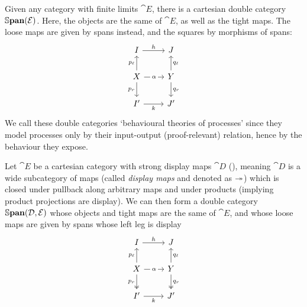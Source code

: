 \begin{example}
\label{ex:behav-processes}
	Given any category with finite limits $\cat E$, there is a cartesian double category $\Span(\cat E)$.
	Here, the objects are the same of $\cat E$, as well as the tight maps.
	The loose maps are given by spans instead, and the squares by morphisms of spans:
	\begin{equation}
		\begin{tikzcd}[ampersand replacement=\&]
			I \& J \\
			X \& Y \\
			{I'} \& {J'}
			\arrow["{p_r}"', from=2-1, to=3-1]
			\arrow["{q_r}", from=2-2, to=3-2]
			\arrow["{p_\ell}", from=2-1, to=1-1]
			\arrow["{q_\ell}"', from=2-2, to=1-2]
			\arrow["\alpha"{description}, from=2-1, to=2-2]
			\arrow["k"', from=3-1, to=3-2]
			\arrow["h", from=1-1, to=1-2]
		\end{tikzcd}
	\end{equation}
	We call these double categories `behavioural theories of processes' since they model processes only by their input-output (proof-relevant) relation, hence by the behaviour they expose.
\end{example}

\begin{example}
\label{ex:gen-behav-processes}
	Let $\cat E$ be a cartesian category with strong display maps $\cat D$ (\cite[Definition~10.4.1]{jacobs_categorical_1999}), meaning $\cat D$ is a wide subcategory of maps (called \emph{display maps} and denoted as $\twoheadrightarrow$) which is closed under pullback along arbitrary maps and under products (implying product projections are display).
	We can then form a double category $\Span(\cat D, \cat E)$ whose objects and tight maps are the same of $\cat E$, and whose loose maps are given by spans whose left leg is display
	\begin{equation}
		\begin{tikzcd}[ampersand replacement=\&]
			I \& J \\
			X \& Y \\
			{I'} \& {J'}
			\arrow["{p_r}"', two heads, from=2-1, to=3-1]
			\arrow["{q_r}", two heads, from=2-2, to=3-2]
			\arrow["{p_\ell}", from=2-1, to=1-1]
			\arrow["{q_\ell}"', from=2-2, to=1-2]
			\arrow["\alpha"{description}, from=2-1, to=2-2]
			\arrow["k"', from=3-1, to=3-2]
			\arrow["h", from=1-1, to=1-2]
		\end{tikzcd}
	\end{equation}
\end{example}
